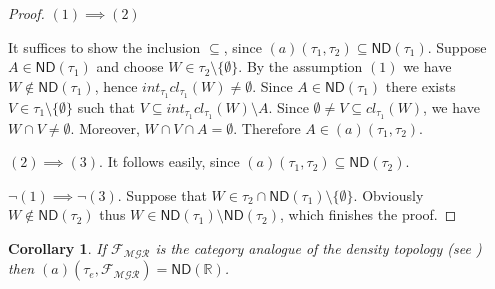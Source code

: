 \documentclass[12pt]{amsart}
\theoremstyle{plain}
\newtheorem{corollary}[theorem]{Corollary}
\theoremstyle{definition}
\theoremstyle{remark}
\newcommand{\cl}{\mathit{cl}}
\newcommand{\meager}{{\mathcal{MGR}}}
\newcommand{\real}{\mathbb{R}}
\newcommand{\cF}{{\mathcal F}}
\newcommand{\cK}{{\mathcal K}}
\newcommand{\mathint}{\mathit{int}}
\newcommand{\aideal}{\mathit{(a)}}
\newcommand{\topWithoutEmptyset}[1]{#1\setminus\lbrace\emptyset\rbrace}
\begin{document}
\begin{proof}  
$(1) \implies (2)$

It suffices to show the inclusion $\subseteq$, since
$\aideal(\tau_1, \tau_2) \subseteq \mathsf{ND}(\tau_1)$.
Suppose $A\in \mathsf{ND}(\tau_1)$ and choose
$W \in \tau_2\setminus\lbrace \emptyset \rbrace$.
By the assumption $(1)$ we have $W \not\in \mathsf{ND}(\tau_1)$, 
hence $\mathint_{\tau_1} \cl_{\tau_1} (W) \not= \emptyset$.
Since $A \in \mathsf{ND}(\tau_1)$ there exists 
$V\in \tau_1\setminus\lbrace\emptyset\rbrace$ such 
that $V \subseteq \mathint_{\tau_1} \cl_{\tau_1} (W) \setminus A$. 
Since $\emptyset \not= V \subseteq \cl_{\tau_1} (W)$, 
we have $W \cap V \not= \emptyset$. Moreover,
$W \cap V \cap A = \emptyset$. Therefore 
$A \in \aideal(\tau_1, \tau_2)$.

$(2) \implies (3)$.
It follows easily, since 
$\aideal(\tau_1, \tau_2) \subseteq \mathsf{ND}(\tau_2)$.

$\neg(1)\implies \neg(3)$.
Suppose that $W\in\tau_2\cap\mathsf{ND}(\tau_1) \setminus \lbrace\emptyset\rbrace$.
Obviously $W\not\in\mathsf{ND}(\tau_2)$ thus
$W \in \mathsf{ND}(\tau_1) \setminus \mathsf{ND}(\tau_2)$,
which finishes the proof.
\end{proof}

\begin{corollary}
If $\cF_{\meager}$ is the category analogue of the density topology (see \cite{PWBW}) 
then 
$(a)(\tau_e, \cF_{\meager}) = \mathsf{ND}(\real)$.
\end{corollary}
\end{document}
